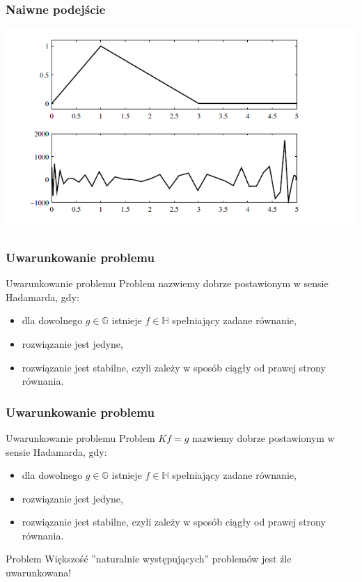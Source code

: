 \documentclass{beamer}
\begin{document}
\begin{frame}\frametitle{Naiwne podejście}
\begin{center}
\includegraphics[scale=0.65]{7}
\end{center}
\end{frame}

\begin{frame}\frametitle{Uwarunkowanie problemu}
\begin{block}{Uwarunkowanie problemu}
Problem nazwiemy dobrze postawionym w sensie Hadamarda, gdy:
\begin{itemize}
\item dla dowolnego $g\in \mathbb{G}$ istnieje $f\in \mathbb{H}$ spełniający zadane równanie,
\item rozwiązanie jest jedyne,
\item rozwiązanie jest stabilne, czyli zależy w sposób ciągły od prawej strony równania.
\end{itemize}
\end{block}
\end{frame}

\begin{frame}\frametitle{Uwarunkowanie problemu}
\begin{block}{Uwarunkowanie problemu}
Problem $Kf=g$ nazwiemy dobrze postawionym w sensie Hadamarda, gdy:
\begin{itemize}
\item dla dowolnego $g\in \mathbb{G}$ istnieje $f\in \mathbb{H}$ spełniający zadane równanie,
\item rozwiązanie jest jedyne,
\item rozwiązanie jest stabilne, czyli zależy w sposób ciągły od prawej strony równania.
\end{itemize}
\end{block}
\begin{block}{Problem}
Większość ''naturalnie występujących'' problemów jest źle uwarunkowana!
\end{block}
\end{frame}
\end{document}

